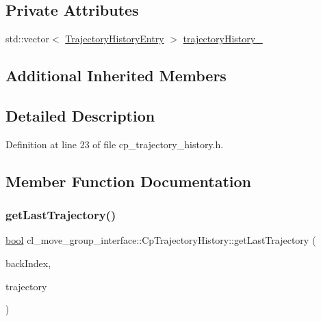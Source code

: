 \subsection*{Private Attributes}
\begin{DoxyCompactItemize}
\item 
std\+::vector$<$ \hyperlink{structcl__move__group__interface_1_1TrajectoryHistoryEntry}{Trajectory\+History\+Entry} $>$ \hyperlink{classcl__move__group__interface_1_1CpTrajectoryHistory_ac5f17b74ca856f6f8ccb96d9a4786fb2}{trajectory\+History\+\_\+}
\end{DoxyCompactItemize}
\subsection*{Additional Inherited Members}


\subsection{Detailed Description}


Definition at line 23 of file cp\+\_\+trajectory\+\_\+history.\+h.



\subsection{Member Function Documentation}
\mbox{\label{classcl__move__group__interface_1_1CpTrajectoryHistory_acca64f5923a0960c704e3e8a727ba3ae}} 
\subsubsection{\texorpdfstring{get\+Last\+Trajectory()}{getLastTrajectory()}\hspace{0.1cm}{\footnotesize\ttfamily [1/2]}}
{\footnotesize\ttfamily \hyperlink{classbool}{bool} cl\+\_\+move\+\_\+group\+\_\+interface\+::\+Cp\+Trajectory\+History\+::get\+Last\+Trajectory (\begin{DoxyParamCaption}\item[{int}]{back\+Index,  }\item[{moveit\+\_\+msgs\+::\+Robot\+Trajectory \&}]{trajectory }\end{DoxyParamCaption})}



